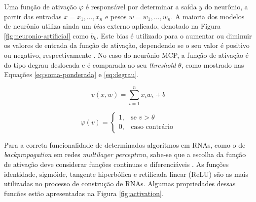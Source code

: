 Uma função de ativação $\varphi$ é responsável por determinar a saída $y$ do neurônio, a partir das entradas $x = x_1, ..., x_n$ e pesos $w = w_1, ..., w_n$. A maioria dos modelos de neurônio utiliza ainda um \emph{bias} externo aplicado, denotado na Figura \ref{fig:neuronio-artificial} como $b_k$. Este bias é utilizado para o aumentar ou diminuir os valores de entrada da função de ativação, dependendo se o seu valor é positivo ou negativo, respectivamente \cite{haykin}. No caso do neurônio MCP, a função de ativação é do tipo degrau deslocada e é comparada ao seu \emph{threshold} $\theta$, como mostrado nas Equações \ref{eq:soma-ponderada} e \ref{eq:degrau}.

\begin{equation}
  \label{eq:soma-ponderada}
  v(x,w) = \sum\limits_{i=1}^n x_i w_i + b
\end{equation}

\begin{equation}
\label{eq:degrau}
\varphi(v) = \left\{
\begin{array}{lr}
  1, & \text{se } v > \theta\\
  0, & \text{caso contrário}
\end{array}
\right.
\end{equation}

Para a correta funcionalidade de determinados algoritmos em RNAs, como o de \emph{backpropagation} em redes \emph{multilayer perceptron}, sabe-se que a escolha da função de ativação deve considerar funções contínuas e diferenciáveis \cite{haykin}. As funções identidade, sigmóide, tangente hiperbólica e retificada linear (ReLU) são as mais utilizadas no processo de construção de RNAs. Algumas propriedades dessas funcões estão apresentadas na Figura \ref{fig:activation}.

